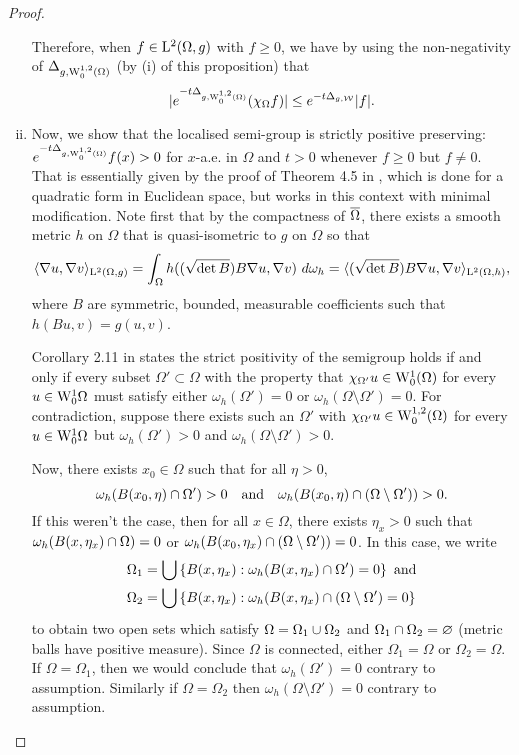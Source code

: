 \documentclass[a4paper, 12pt]{amsart}
\begin{document}
\begin{proof}
\begin{enumerate}[(i)]
        Therefore, when $f \in \Lp{2}(\Omega,g)$ with $f \geq 0$, we have by using the non-negativity of $\Delta_{g, \SobH[0]{1}(\Omega)}$ (by (i) of this proposition) that
	$$ \modulus{e^{-t\Delta_{g, \SobH[0]{1}(\Omega)}} (\chi_{\Omega} f)} \leq e^{-t \Delta_{g, \cW}} \modulus{f}.$$

\item Now, we show that the localised semi-group is strictly positive preserving: $e^{-t\Delta_{g,\SobH[0]{1}(\Omega)}}f (x) > 0$ for $x$-a.e. in $\Omega$ and $t>0$ whenever $f \geq 0$ but $f \neq 0$.
	That is essentially given by the proof of Theorem 4.5 in \cite{El-Maati}, which is done for a quadratic form in Euclidean space, but works in this context with minimal modification.
	Note first that by the compactness of $\close{\Omega}$, there exists a smooth metric $h$ on $\Omega$ that is quasi-isometric to $g$ on $\Omega$ so that 
	$$ \inprod{\nabla u, \nabla v}_{\Lp{2}(\Omega,g)} = \int_{\Omega} h((\sqrt{\det B}) B \nabla u, \nabla v)\ d\omega_h = \inprod{(\sqrt{\det B})B \nabla u, \nabla v}_{\Lp{2}(\Omega,h)},$$
	where $B$ are symmetric, bounded, measurable coefficients such that $h(Bu,v) = g(u,v)$.

	Corollary 2.11 in \cite{El-Maati} states the strict positivity of the semigroup  holds if and only if every subset $\Omega' \subset \Omega$ with the property that $\chi_{\Omega'} u \in \Sob[0]{1}(\Omega)$ for every $u \in \Sob[0]{1}\Omega$ must satisfy either $\omega_h(\Omega') = 0$ or $\omega_h(\Omega\setminus \Omega') = 0$. 
	For contradiction, suppose there exists such an $\Omega'$ with $\chi_{\Omega'} u \in \SobH[0]{1}(\Omega)$ for every $u \in \Sob[0]{1}\Omega$ but $\omega_h(\Omega') > 0$ and $\omega_h(\Omega \setminus \Omega') > 0$.

        Now, there exists $x_0 \in \Omega$ such that for all $\eta > 0$,
	$$\omega_h(B(x_0, \eta) \intersect \Omega') > 0\quad\text{and}\quad\omega_h(B(x_0, \eta) \intersect (\Omega\setminus\Omega'))> 0.$$
	If this weren't the case, then for all $x \in \Omega$, there exists $\eta_x > 0$ such that $\omega_h(B(x, \eta_x) \intersect \Omega) = 0$ or $\omega_h(B(x_0, \eta_x) \intersect (\Omega\setminus\Omega')) = 0$. In this case, we write 
	\begin{align*} 
	\Omega_1 &= \Union \set{B(x,\eta_x): \omega_h(B(x, \eta_x) \intersect \Omega') = 0}\ \text{and}\\
	\Omega_2 &= \Union \set{B(x,\eta_x): \omega_h(B(x, \eta_x) \intersect(\Omega \setminus \Omega') = 0}
	\end{align*}
	to obtain two open sets which satisfy $\Omega = \Omega_1 \union \Omega_2$ and $\Omega_1 \intersect \Omega_2 = \emptyset$ (metric balls have positive measure). Since $\Omega$ is connected, either $\Omega_1 = \Omega$ or $\Omega_2 = \Omega$. If $\Omega = \Omega_1$, then we would conclude that $\omega_h(\Omega') = 0$ contrary to assumption. Similarly if $\Omega = \Omega_2$ then $\omega_h(\Omega \setminus \Omega') = 0$ contrary to assumption.


\end{enumerate}
\end{proof}
\end{document}
